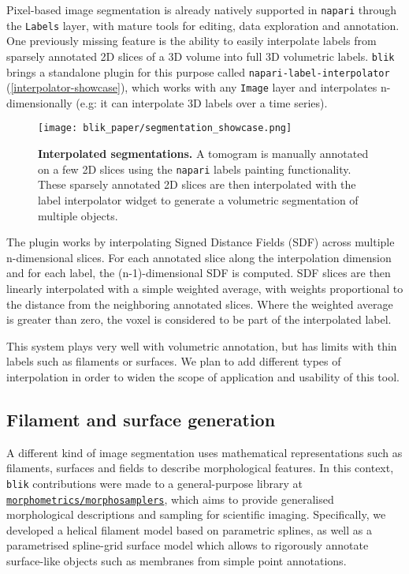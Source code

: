 Pixel-based image segmentation is already natively supported in \texttt{napari} through the \texttt{Labels} layer, with mature tools for editing, data exploration and annotation. One previously missing feature is the ability to easily interpolate labels from sparsely annotated 2D slices of a 3D volume into full 3D volumetric labels. \texttt{blik} brings a standalone plugin for this purpose called \texttt{napari-label-interpolator} (\autoref{interpolator-showcase}), which works with any \texttt{Image} layer and interpolates n-dimensionally (e.g: it can interpolate 3D labels over a time series).

\begin{figure}[!ht]
    \centering
    \texttt{[image: blik\_paper/segmentation\_showcase.png]}
    \caption[Interpolated segmentations]{\textbf{Interpolated segmentations.} A tomogram is manually annotated on a few 2D slices using the \texttt{napari} labels painting functionality. These sparsely annotated 2D slices are then interpolated with the label interpolator widget to generate a volumetric segmentation of multiple objects.}
    \label{interpolator-showcase}
\end{figure}

The plugin works by interpolating Signed Distance Fields (SDF) across multiple n-dimensional slices. For each annotated slice along the interpolation dimension and for each label, the (n-1)-dimensional SDF is computed. SDF slices are then linearly interpolated with a simple weighted average, with weights proportional to the distance from the neighboring annotated slices. Where the weighted average is greater than zero, the voxel is considered to be part of the interpolated label.

This system plays very well with volumetric annotation, but has limits with thin labels such as filaments or surfaces. We plan to add different types of interpolation in order to widen the scope of application and usability of this tool.

\subsection{Filament and surface generation}\label{filament-and-surface-generation}

A different kind of image segmentation uses mathematical representations such as filaments, surfaces and fields to describe morphological features. In this context, \texttt{blik} contributions were made to a general-purpose library at \href{https://github.com/morphometrics/morphosamplers}{\texttt{morphometrics\-/\-morphosamplers}}, which aims to provide generalised morphological descriptions and sampling for scientific imaging. Specifically, we developed a helical filament model based on parametric splines, as well as a parametrised spline-grid surface model which allows to rigorously annotate surface-like objects such as membranes from simple point annotations.


